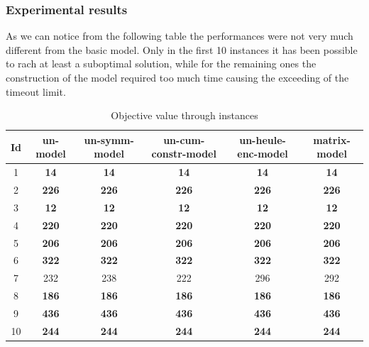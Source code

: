 \subsubsection*{Experimental results}

As we can notice from the following table the performances were not very much different from the basic model. Only in the first 10 instances it has been possible to rach at least a suboptimal solution, while for the remaining ones the construction of the model required too much time causing the exceeding of the timeout limit.
\begin{table}[h]
    \centering
    \caption{Objective value through instances}
    \begin{tabular}{cccccc}
            \toprule
            Id & un-model & un-symm-model & un-cum-constr-model & un-heule-enc-model & matrix-model \\ 
            \midrule
            1 & \textbf{14} &       \textbf{14} &   \textbf{14} &   \textbf{14} &   \textbf{14} \\ 
            2 & \textbf{226} &      \textbf{226} &  \textbf{226} &  \textbf{226} &  \textbf{226} \\ 
            3 & \textbf{12} &       \textbf{12} &   \textbf{12} &   \textbf{12} &   \textbf{12} \\ 
            4 & \textbf{220} &      \textbf{220} &  \textbf{220} &  \textbf{220} &  \textbf{220} \\ 
            5 & \textbf{206} &      \textbf{206} &  \textbf{206} &  \textbf{206} &  \textbf{206} \\ 
            6 & \textbf{322} &      \textbf{322} &  \textbf{322} &  \textbf{322} &  \textbf{322} \\ 
            7 & 232 &       238 &   222 &   296 &   292 \\ 
            8 & \textbf{186} &      \textbf{186} &  \textbf{186} &  \textbf{186} &  \textbf{186} \\ 
            9 & \textbf{436} &      \textbf{436} &  \textbf{436} &  \textbf{436} &  \textbf{436} \\ 
            10 & \textbf{244} &     \textbf{244} &  \textbf{244} &  \textbf{244} &  \textbf{244} \\ 
            \bottomrule
    \end{tabular}
\end{table}


